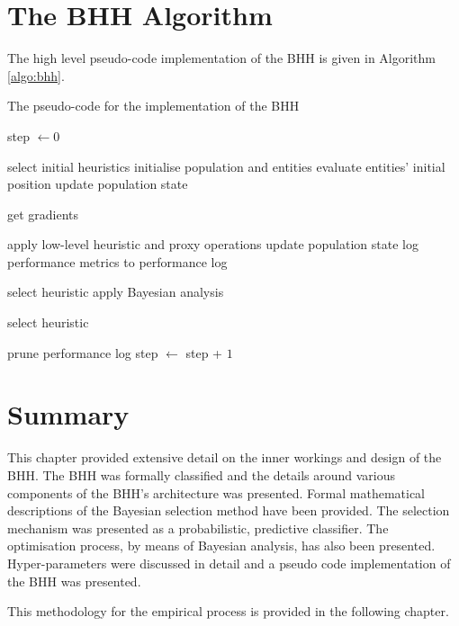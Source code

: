 \section{The \acs{BHH} Algorithm}
\label{sec:bhh:algorithm}

The high level pseudo-code implementation of the \acs{BHH} is given in Algorithm \ref{algo:bhh}.

\begin{algorithm}[htb]
      \caption{The pseudo-code for the implementation of the \acf{BHH}}
      \label{algo:bhh}
      \begin{algorithmic}
            \State step $\gets 0$

            \State select initial heuristics
            \State initialise population and entities
            \State evaluate entities' initial position
            \State update population state

            \State get gradients
            \EndIf

            \State apply low-level heuristic and proxy operations
            \State update population state
            \State log performance metrics to performance log

            \State select heuristic
            \Else
            \State apply Bayesian analysis
            \EndIf

            \State select heuristic
            \EndIf

            \State prune performance log
            \EndIf
            \EndIf
            \EndFor
            \State step $\gets$ step + $1$
            \EndWhile
      \end{algorithmic}
\end{algorithm}

\section{Summary}
\label{sec:bhh:summary}

This chapter provided extensive detail on the inner workings and design of the \acs{BHH}. The \acs{BHH} was formally classified and the details around various components of the \acs{BHH}'s architecture was presented. Formal mathematical descriptions of the Bayesian selection method have been provided. The selection mechanism was presented as a probabilistic, predictive classifier. The optimisation process, by means of Bayesian analysis, has also been presented. Hyper-parameters were discussed in detail and a pseudo code implementation of the \acs{BHH} was presented.

This methodology for the empirical process is provided in the following chapter.
